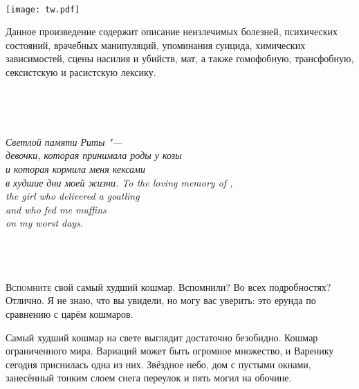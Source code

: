 \newpage\thispagestyle{plain}
{~\par}
\vfill
{\centering\texttt{[image: tw.pdf]}\par}
\vspace{1em}
{\centering\Large{}\par}
\vspace{0.5em}
{\centering\large{Данное произведение содержит описание неизлечимых болезней, психических состояний, врачебных манипуляций, упоминания суицида, химических зависимостей, сцены насилия и убийств, мат, а также гомофобную, трансфобную, сексистскую и расистскую лексику.}\par}
\vfill
{~\par}

\tableofcontents

\newpage\thispagestyle{plain}
{~\par}
\vfill
{\centering\Large\textit{
{Светлой памяти Риты "---\\девочки, которая принимала роды у козы\\и которая кормила меня кексами\\в худшие дни моей жизни.}
{To the loving memory of \Rita,\\the girl who delivered a goatling\\and who fed me muffins\\on my worst days.}
}\par}
\vfill
{~\par}

\pagestyle{fancy}

\chapter{}

\lettrine[lines=4,slope=0pt,nindent=3pt]{В}{спомните} свой самый худший кошмар.
Вспомнили?
Во всех подробностях?
Отлично.
Я не знаю, что вы увидели, но могу вас уверить: это ерунда по сравнению с царём кошмаров.

Самый худший кошмар на свете выглядит достаточно безобидно.
Кошмар ограниченного мира.
Вариаций может быть огромное множество, и Варенику сегодня приснилась одна из них.
Звёздное небо, дом с пустыми окнами, занесённый тонким слоем снега переулок и пять могил на обочине.

